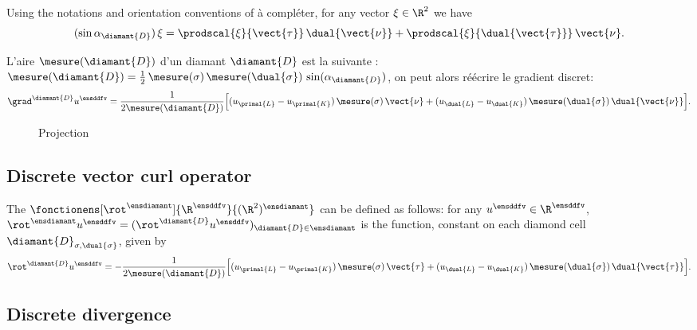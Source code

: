 \begin{lemme}
Using the notations and orientation conventions of {\color{red}à compléter}, for any vector $\xi \in \R^2$ we have
\[
(\sin \alpha_{\diamant{D}}) \, \xi = \prodscal{\xi}{\vect{\tau}} \, \dual{\vect{\nu}} + \prodscal{\xi}{\dual{\vect{\tau}}} \, \vect{\nu}.
\]
\end{lemme}
L'aire $\mesure(\diamant{D})$ d'un diamant $\diamant{D}$ est la suivante : $\mesure(\diamant{D}) = \frac{1}{2} \, \mesure(\sigma) \, \mesure(\dual{\sigma}) \, \sin(\alpha_{\diamant{D}})$, on peut alors réécrire le gradient discret:
\[
\grad^{\diamant{D}} u^\ensddfv = \frac{1}{2\mesure(\diamant{D})} \Big[ (u_{\primal{L}} - u_{\primal{K}}) \, \mesure(\sigma) \, \vect{\nu} + (u_{\dual{L}} - u_{\dual{K}}) \, \mesure(\dual{\sigma}) \, \dual{\vect{\nu}} \Big].
\]
\begin{figure}[H]
    \centering
    
    \caption{Projection \ddfv}
\end{figure}

\subsection{Discrete vector curl operator}

\begin{defi}
The  $\fonctionens[\rot^\ensdiamant]{\R^\ensddfv}{(\R^2)^\ensdiamant}$ can be defined as follows: for any $u^\ensddfv \in \R^\ensddfv$, $\rot^\ensdiamant u^\ensddfv = (\rot^{\diamant{D}} u^\ensddfv)_{\diamant{D} \in \ensdiamant}$ is the function, constant on each diamond cell $\diamant{D}_{\sigma,\dual{\sigma}}$, given by
\[
\rot^{\diamant{D}} u^\ensddfv = - \frac{1}{2 \mesure(\diamant{D})} \Big[ (u_{\primal{L}} - u_{\primal{K}}) \, \mesure(\sigma) \, \vect{\tau} + (u_{\dual{L}} - u_{\dual{K}}) \, \mesure(\dual{\sigma}) \, \dual{\vect{\tau}} \Big].
\]
\end{defi}

\subsection{Discrete divergence}

